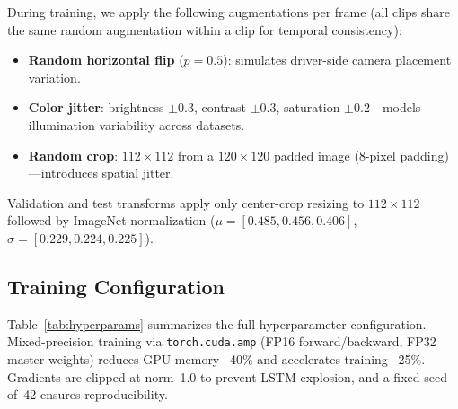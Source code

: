 \documentclass[journal]{IEEEtran}
\begin{document}
During training, we apply the following augmentations per frame (all clips share the same random augmentation within a clip for temporal consistency):
\begin{itemize}[leftmargin=*]
  \item \textbf{Random horizontal flip} ($p{=}0.5$): simulates driver-side camera placement variation.
  \item \textbf{Color jitter}: brightness $\pm 0.3$, contrast $\pm 0.3$, saturation $\pm 0.2$---models illumination variability across datasets.
  \item \textbf{Random crop}: $112\times112$ from a $120\times120$ padded image (8-pixel padding)---introduces spatial jitter.
\end{itemize}
Validation and test transforms apply only center-crop resizing to $112\times112$ followed by ImageNet normalization ($\mu = [0.485, 0.456, 0.406]$, $\sigma = [0.229, 0.224, 0.225]$).

\subsection{Training Configuration}
\label{sec:train_config}

Table~\ref{tab:hyperparams} summarizes the full hyperparameter configuration. Mixed-precision training via \texttt{torch.cuda.amp} (FP16 forward/backward, FP32 master weights) reduces GPU memory ~40\% and accelerates training ~25\%. Gradients are clipped at norm~1.0 to prevent LSTM explosion, and a fixed seed of~42 ensures reproducibility.
\end{document}
